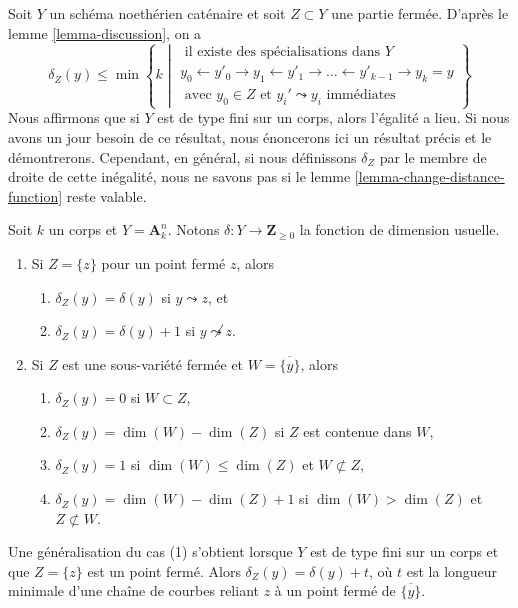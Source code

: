 \begin{remark}
\label{remark-discussion}
Soit $Y$ un schéma noethérien caténaire et soit $Z \subset Y$
une partie fermée. D'après le lemme \ref{lemma-discussion}, on a
$$
\delta_Z(y) \leq \min
\left\{ k \middle|
\begin{matrix}
\text{ il existe des spécialisations dans }Y \\
y_0 \leftarrow y'_0 \rightarrow y_1 \leftarrow y'_1 \rightarrow \ldots
\leftarrow y'_{k - 1} \rightarrow y_k = y \\
\text{ avec }y_0 \in Z\text{ et }y_i' \leadsto y_i
\text{ immédiates}
\end{matrix}
\right\}
$$
Nous affirmons que si $Y$ est de type fini sur un corps,
alors l'égalité a lieu. Si nous avons un jour besoin de ce résultat, nous
énoncerons ici un résultat précis et le démontrerons.
Cependant, en général, si nous définissons $\delta_Z$
par le membre de droite de cette inégalité, nous ne
savons pas si le lemme \ref{lemma-change-distance-function} reste valable.
\end{remark}

\begin{example}
\label{example-distance}
Soit $k$ un corps et $Y = \mathbf{A}^n_k$. Notons
$\delta : Y \to \mathbf{Z}_{\geq 0}$ la fonction de dimension usuelle.
\begin{enumerate}
\item Si $Z = \{z\}$ pour un point fermé $z$, alors
\begin{enumerate}
\item $\delta_Z(y) = \delta(y)$ si $y \leadsto z$, et
\item $\delta_Z(y) = \delta(y) + 1$ si $y \not \leadsto z$.
\end{enumerate}
\item Si $Z$ est une sous-variété fermée et $W = \overline{\{y\}}$, alors
\begin{enumerate}
\item $\delta_Z(y) = 0$ si $W \subset Z$,
\item $\delta_Z(y) = \dim(W) - \dim(Z)$ si $Z$ est contenue dans $W$,
\item $\delta_Z(y) = 1$ si $\dim(W) \leq \dim(Z)$ et $W \not \subset Z$,
\item $\delta_Z(y) = \dim(W) - \dim(Z) + 1$ si $\dim(W) > \dim(Z)$
et $Z \not \subset W$.
\end{enumerate}
\end{enumerate}
Une généralisation du cas (1) s'obtient lorsque $Y$ est de type fini sur un corps
et que $Z = \{z\}$ est un point fermé. Alors $\delta_Z(y) = \delta(y) + t$,
où $t$ est la longueur minimale d'une chaîne de courbes reliant
$z$ à un point fermé de $\overline{\{y\}}$.
\end{example}







